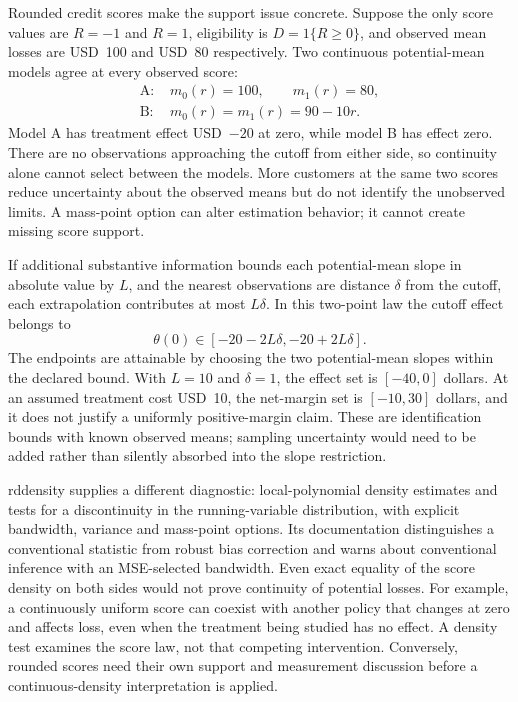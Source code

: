 Rounded credit scores make the support issue concrete. Suppose the only score
values are $R=-1$ and $R=1$, eligibility is $D=1\{R\geq0\}$, and observed mean
losses are USD~100 and USD~80 respectively. Two continuous potential-mean models
agree at every observed score:
\begin{align}
 \text{A: }&m_0(r)=100,\qquad m_1(r)=80,\nonumber\\
 \text{B: }&m_0(r)=m_1(r)=90-10r.
 \label{exec22:riv-support}
\end{align}
Model A has treatment effect USD~$-20$ at zero, while model B has effect zero.
There are no observations approaching the cutoff from either side, so continuity
alone cannot select between the models. More customers at the same two scores
reduce uncertainty about the observed means but do not identify the unobserved
limits. A mass-point option can alter estimation behavior; it cannot create
missing score support.\citep{exec22_riv_reference,exec22_riv_rdrobust}

If additional substantive information bounds each potential-mean slope in
absolute value by $L$, and the nearest observations are distance $\delta$ from
the cutoff, each extrapolation contributes at most $L\delta$. In this
two-point law the cutoff effect belongs to
\begin{equation}
 \theta(0)\in[-20-2L\delta,-20+2L\delta].
 \label{exec22:riv-bound}
\end{equation}
The endpoints are attainable by choosing the two potential-mean slopes within
the declared bound. With $L=10$ and $\delta=1$, the effect set is
$[-40,0]$ dollars. At an assumed treatment cost USD~10, the net-margin set is
$[-10,30]$ dollars, and it does not justify a uniformly positive-margin claim.
These are identification bounds with known observed means; sampling uncertainty
would need to be added rather than silently absorbed into the slope restriction.

rddensity supplies a different diagnostic: local-polynomial density estimates
and tests for a discontinuity in the running-variable distribution, with explicit
bandwidth, variance and mass-point options. Its documentation distinguishes a
conventional statistic from robust bias correction and warns about conventional
inference with an MSE-selected bandwidth.\citep{exec22_riv_rddensity}
Even exact equality of the score density on both sides would not prove continuity
of potential losses. For example, a continuously uniform score can coexist with
another policy that changes at zero and affects loss, even when the treatment
being studied has no effect. A density test examines the score law, not that
competing intervention. Conversely, rounded scores need their own support and
measurement discussion before a continuous-density interpretation is applied.

